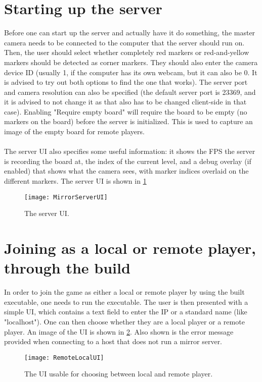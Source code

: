 \documentclass[]{report}
\begin{document}
\section*{Starting up the server}
Before one can start up the server and actually have it do something, the master
camera needs to be connected to the computer that the server should run on. 
Then, the user should select whether completely red markers or red-and-yellow
markers should be detected as corner markers. They should also enter the camera
device ID (usually 1, if the computer has its own webcam, but it can also be 0.
It is advised to try out both options to find the one that works). The server
port and camera resolution can also be specified (the default server port is 
23369, and it is advised to not change it as that also has to be changed
client-side in that case). Enabling "Require empty board" will require the board
to be empty (no markers on the board) before the server is initialized. This is
used to capture an image of the empty board for remote players. \\
\\
The server UI also specifies some useful information: it shows the FPS the
server is recording the board at, the index of the current level, and a debug
overlay (if enabled) that shows what the camera sees, with marker indices
overlaid on the different markers. The server UI is shown in \ref{fig:serverui}
\begin{figure}[!ht]
    \centering
    \texttt{[image: MirrorServerUI]}
    \caption{The server UI.}
    \label{fig:serverui}
\end{figure}

\section*{Joining as a local or remote player, through the build}
In order to join the game as either a local or remote player by using the built
executable, one needs to run the executable. The user is then presented with a
simple UI, which contains a text field to enter the IP or a standard name (like
"localhost"). One can then choose whether they are a local player or a remote
player. An image of the UI is shown in \ref{fig:remotelocalui}. Also shown is the
error message provided when connecting to a host that does not run a mirror server.
\begin{figure}[!ht]
    \centering
    \texttt{[image: RemoteLocalUI]}
    \caption{The UI usable for choosing between local and remote player.}
    \label{fig:remotelocalui}
\end{figure}
\end{document}

